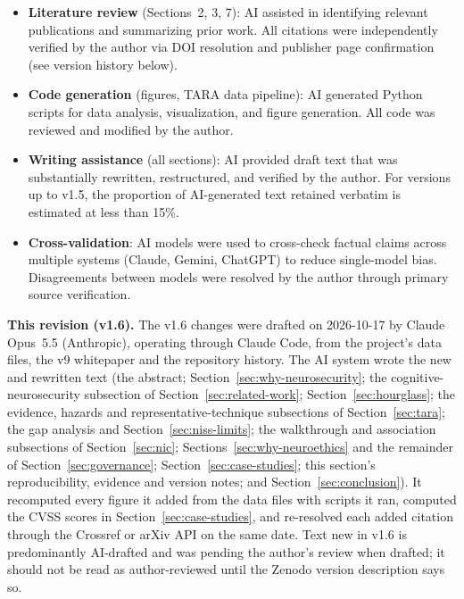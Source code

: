 \begin{itemize}
  \item \textbf{Literature review} (Sections~2, 3, 7): AI assisted in identifying
        relevant publications and summarizing prior work. All citations were
        independently verified by the author via DOI resolution and publisher page
        confirmation (see version history below).
  \item \textbf{Code generation} (figures, TARA data pipeline): AI generated
        Python scripts for data analysis, visualization, and figure generation. All
        code was reviewed and modified by the author.
  \item \textbf{Writing assistance} (all sections): AI provided draft text that was
        substantially rewritten, restructured, and verified by the author. For versions
        up to v1.5, the proportion of AI-generated text retained verbatim is estimated at
        less than 15\%.
  \item \textbf{Cross-validation}: AI models were used to cross-check factual claims
        across multiple systems (Claude, Gemini, ChatGPT) to reduce single-model
        bias. Disagreements between models were resolved by the author through
        primary source verification.
\end{itemize}

\noindent\textbf{This revision (v1.6).} The v1.6 changes were drafted on 2026-10-17 by Claude
Opus~5.5 (Anthropic), operating through Claude Code, from the project's data files, the v9
whitepaper and the repository history. The AI system wrote the new and rewritten text (the
abstract; Section~\ref{sec:why-neurosecurity}; the cognitive-neurosecurity subsection of
Section~\ref{sec:related-work}; Section~\ref{sec:hourglass}; the evidence, hazards and
representative-technique subsections of Section~\ref{sec:tara}; the gap analysis and
Section~\ref{sec:niss-limits}; the walkthrough and association subsections of
Section~\ref{sec:nic}; Sections~\ref{sec:why-neuroethics} and the remainder of
Section~\ref{sec:governance}; Section~\ref{sec:case-studies}; this section's reproducibility,
evidence and version notes; and Section~\ref{sec:conclusion}). It recomputed every figure
it added from the data files with scripts it ran, computed the CVSS scores in
Section~\ref{sec:case-studies}, and re-resolved each added citation through the Crossref or
arXiv API on the same date. Text new in v1.6 is predominantly AI-drafted and was pending
the author's review when drafted; it should not be read as author-reviewed until the
Zenodo version description says so.

